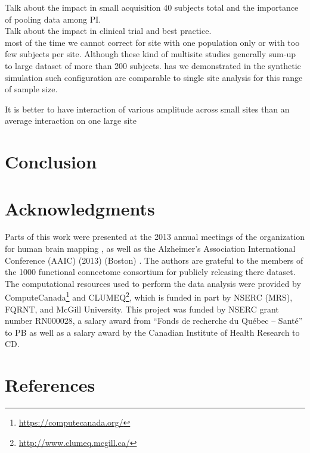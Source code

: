 \documentclass[authoryear]{elsarticle}
\begin{document}
Talk about the impact in small acquisition 40 subjects total and the importance of pooling data among PI.\\

Talk about the impact in clinical trial and best practice.\\
	most of the time we cannot correct for site with one population only or with too few subjects per site. Although these kind of multisite studies generally sum-up to large dataset of more than 200 subjects. has we demonstrated in the synthetic simulation such configuration are comparable to single site analysis for this range of sample size.

It is better to have interaction of various amplitude across small sites than an average interaction on one large site\\

\section{Conclusion}


\section{Acknowledgments}
Parts of this work were presented at the 2013 annual meetings of the organization for human brain mapping \citep{Dansereau2013a}, as well as the  Alzheimer's Association International Conference (AAIC) (2013) (Boston) \citep{Dansereau2013b}. The authors are grateful to the members of the 1000 functional connectome consortium for publicly releasing there dataset. The computational resources used to perform the data analysis were provided by ComputeCanada\footnote{\url{https://computecanada.org/}} and CLUMEQ\footnote{\url{http://www.clumeq.mcgill.ca/}}, which is funded in part by NSERC (MRS), FQRNT, and McGill University. This project was funded by NSERC grant number RN000028, a salary award from ``Fonds de recherche du Qu\'ebec -- Sant\'e'' to PB as well as a salary award by the Canadian Institute of Health Research to CD.

\section*{References}





\pagebreak



\clearpage
\appendix
\end{document}
